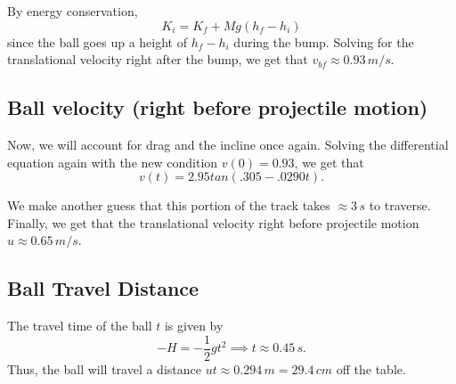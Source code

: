 \documentclass[12pt]{article} %
\begin{document}
By energy conservation,
$$K_i = K_f + Mg(h_f - h_i)$$
since the ball goes up a height of $h_f - h_i$ during the bump.
Solving for the translational velocity right after the bump, we get that $v_{bf} \approx 0.93\,m/s$.

\subsection{Ball velocity (right before projectile motion)}

Now, we will account for drag and the incline once again.
Solving the differential equation again with the new condition $v(0) = 0.93$, we get that $$v(t) = 2.95tan(.305 - .0290t).$$

We make another guess that this portion of the track takes $\approx 3\, s$ to traverse. Finally, we get that the translational velocity right before projectile motion $u \approx 0.65\, m/s$.

\subsection{Ball Travel Distance}

The travel time of the ball $t$ is given by
$$-H = -\frac{1}{2}gt^2 \implies t \approx 0.45\,s.$$
Thus, the ball will travel a distance $ut \approx 0.294\,m = 29.4\,cm$ off the table.
\end{document}
